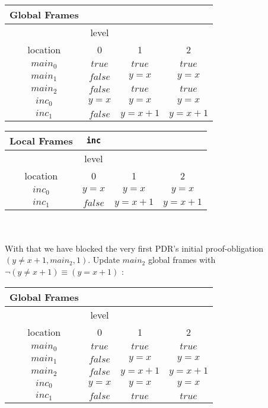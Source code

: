 \documentclass{article}
\begin{document}
\begin{minipage}{.5\textwidth}
	\setlength\tabcolsep{0.35em}
	\begin{center}
		\begin{tabu}{cccc}
			Global Frames \\
			\toprule
			& level \\
			\cmidrule(lr){2-4}
			location & 0 & 1 & 2 \\
			$main_0$ & $true$ & $true$ & $true$  \\
			$main_1$ & $false$ & $y = x$ & $y = x$\\
			$main_2$ & $false$ & $true$ & $true$ \\
			$inc_0$ & $y = x$ & $y = x$ & $y = x$ \\
			$inc_1$ & $false$ & $y = x + 1$ & $y = x + 1$\\
			\bottomrule
		\end{tabu}
	\end{center}
\end{minipage}
\hfill
\begin{minipage}{.6\textwidth}
	\setlength\tabcolsep{0.35em}
	\begin{center}
		\begin{tabu}{cccc}
			Local Frames & \texttt{inc}\\
			\toprule
			& level \\
			\cmidrule(lr){2-4}
			location & 0 & 1 & 2\\
			$inc_0$ & $y = x$ & $y = x$ & $y = x$  \\
			$inc_1$ & $false$ & $y = x + 1$  & $y = x + 1$\\
			\bottomrule
		\end{tabu}
	\end{center}	
\end{minipage} \\ \\

With that we have blocked the very first PDR's initial proof-obligation $(y \neq x + 1, main_2, 1)$. Update $main_2$ global frames with $\neg(y \neq x + 1) \equiv (y = x + 1)$ : \\

\setlength\tabcolsep{0.35em}
\begin{center}
	\begin{tabu}{cccc}
		Global Frames \\
		\toprule
		& level \\
		\cmidrule(lr){2-2}
		location & 0 & 1 & 2 \\
		$main_0$ & $true$ & $true$ & $true$  \\
		$main_1$ & $false$ & $y = x$ & $y = x$\\
		$main_2$ & $false$ & $y = x + 1$ & $y = x + 1$ \\
		$inc_0$ & $y = x$ & $y = x$ & $y = x$ \\
		$inc_1$ & $false$ & $true$ & $true$\\
		\bottomrule
	\end{tabu}
\end{center}
\end{document}

